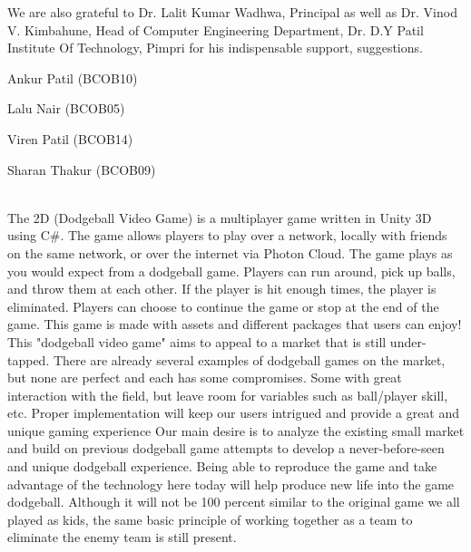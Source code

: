 \documentclass[12pt]{report}
\begin{document}
We are also grateful to Dr. Lalit Kumar Wadhwa, Principal as well as Dr. Vinod V. Kimbahune, Head of Computer Engineering Department, Dr. D.Y Patil Institute Of Technology, Pimpri for his indispensable support, suggestions.


\begin{flushright}

\normalsize  {Ankur Patil (BCOB10)}

\normalsize  {Lalu Nair (BCOB05)}

\normalsize  {Viren Patil (BCOB14)}

\normalsize  {Sharan Thakur (BCOB09)}
\end{flushright}
\thispagestyle{empty}
\clearpage
 
\vspace{4 cm}
\\
\vspace{1 cm}
\justifying
\setlength{\parindent}{4em}
\setlength{\parskip}{1em}
\renewcommand{\baselinestretch}{1.5}
\normalsize
The 2D (Dodgeball Video Game) is a multiplayer game written in Unity 3D using C\#. The game allows players to play over a network, locally with friends on the same network, or over the internet via Photon Cloud. The game plays as you would expect from a dodgeball game. Players can run around, pick up balls, and throw them at each other. If the player is hit enough times, the player is eliminated. Players can choose to continue the game or stop at the end of the game. This game is made with assets and different packages that users can enjoy! This "dodgeball video game" aims to appeal to a market that is still under-tapped. There are already several examples of dodgeball games on the market, but none are perfect and each has some compromises. Some with great interaction with the field, but leave room for variables such as ball/player skill, etc. Proper implementation will keep our users intrigued  and provide a great and unique gaming experience Our main desire is to analyze the existing small market and build on previous dodgeball game attempts to develop a never-before-seen and unique dodgeball experience. Being able to reproduce the game and take advantage of the technology here today will help produce new life into the game dodgeball. Although it will not be 100 percent similar to the original game we all played as kids, the same basic principle of working together as a team to eliminate the enemy team is still present.
\end{document}

